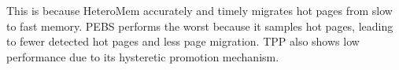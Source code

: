 This is because HeteroMem accurately and timely migrates hot pages from slow to fast memory.
PEBS performs the worst because it samples hot pages, leading to fewer detected hot pages and less page migration.
TPP also shows low performance due to its hysteretic promotion mechanism.

